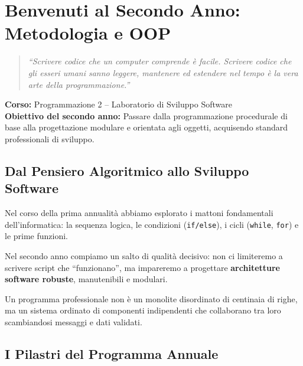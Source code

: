 \chapter{Benvenuti al Secondo Anno: Metodologia e OOP}
\label{chap:intro-secondo-anno}

\begin{quote}
\itshape
\small
``Scrivere codice che un computer comprende è facile. Scrivere codice che gli esseri umani sanno leggere, mantenere ed estendere nel tempo è la vera arte della programmazione.''
\end{quote}
\vspace{1em}

\noindent\textbf{Corso:} Programmazione 2 -- Laboratorio di Sviluppo Software\\
\textbf{Obiettivo del secondo anno:} Passare dalla programmazione procedurale di base alla progettazione modulare e orientata agli oggetti, acquisendo standard professionali di sviluppo.

\vspace{1.5em}

\section{Dal Pensiero Algoritmico allo Sviluppo Software}

Nel corso della prima annualità abbiamo esplorato i mattoni fondamentali dell'informatica: la sequenza logica, le condizioni (\texttt{if/else}), i cicli (\texttt{while}, \texttt{for}) e le prime funzioni.

Nel secondo anno compiamo un salto di qualità decisivo: non ci limiteremo a scrivere script che ``funzionano'', ma impareremo a progettare \textbf{architetture software robuste}, manutenibili e modulari.

\begin{concetto}
Un programma professionale non è un monolite disordinato di centinaia di righe, ma un sistema ordinato di componenti indipendenti che collaborano tra loro scambiandosi messaggi e dati validati.
\end{concetto}

\section{I Pilastri del Programma Annuale}

